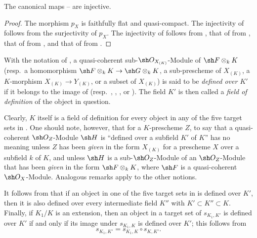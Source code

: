 \begin{proposition}[4.8.3]
\label{IV.4.8.3}
The canonical maps -- are
injective.
\end{proposition}

\begin{proof}
The morphism $p_X$ is faithfully flat and quasi-compact.
The injectivity of  follows from the surjectivity of
$p_X$.
The injectivity of  follows from
, that of  from
, that of  from
, and that of  from
.
\end{proof}


\begin{definition}[4.8.4]
\label{IV.4.8.4}
With the notation of , a quasi-coherent
sub-$\sh O_{X_{(K)}}$-Module of $\sh F\otimes_kK$
(resp.\ a homomorphism
$\sh F\otimes_kK\to\sh G\otimes_kK$, a sub-prescheme of $X_{(K)}$,
a $K$-morphism $X_{(K)}\to Y_{(K)}$, or a subset of $X_{(K)}$)
is said to be \emph{defined over $K'$} if it belongs to the image of
(resp.\ , ,
, or ).
The field $K'$ is then called a \emph{field of definition} of the
object in question.
\end{definition}

Clearly, $K$ itself is a field of definition for every object in any
of the five target sets in .
One should note, however, that for a $K$-prescheme $Z$, to say that a
quasi-coherent $\sh O_Z$-Module $\sh H$ is ``defined over a subfield
$K'$ of $K$'' has no meaning unless $Z$ has been \emph{given} in the
form $X_{(K)}$ for a prescheme $X$ over a subfield $k$ of $K$, and
unless $\sh H$ is a sub-$\sh O_Z$-Module of an $\sh O_Z$-Module that
has been \emph{given} in the form $\sh F\otimes_kK$, where $\sh F$ is
a quasi-coherent $\sh O_X$-Module.
Analogous remarks apply to the other notions.

It follows from  that if an object in one of the
five target sets in  is defined over $K'$, then it is
also defined over every intermediate field $K''$ with
$K'\subset K''\subset K$.
Finally, if $K_1/K$ is an extension, then an object in a target set
of $s_{K_1,K'}$ is defined over $K'$ if and only if its image under
$s_{K_1,K}$ is defined over $K'$; this follows from
\[
s_{K_1,K'}=s_{K_1,K}\circ s_{K,K'}.
\]

